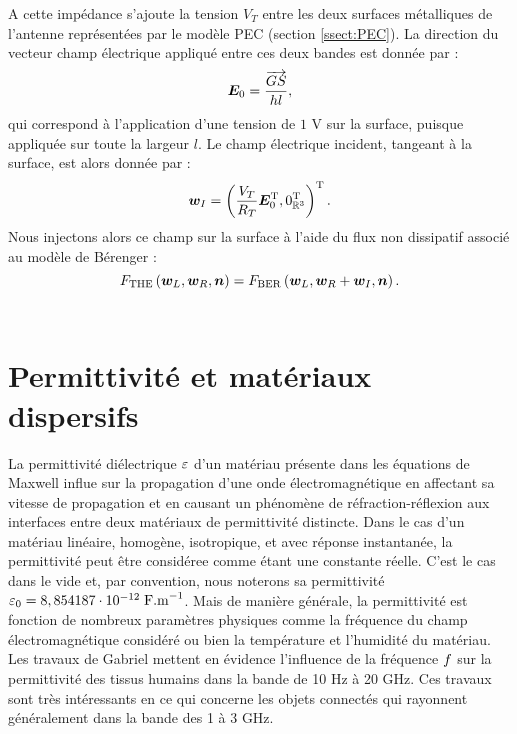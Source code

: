 A cette impédance s'ajoute la tension $V_T$ entre les deux surfaces
métalliques de l'antenne représentées par le modèle PEC (section \ref{ssect:PEC}).
La direction du vecteur champ électrique appliqué entre ces deux bandes est donnée par :
\begin{align}
	\bm{E}_0 = \frac{\overrightarrow{GS}}{h l} ,
\end{align}
qui correspond à l'application d'une tension de $1$ V sur la surface,
puisque appliquée sur toute la largeur $l$.
Le champ électrique incident, tangeant à la surface, est alors donnée par :
\begin{align}
	\bm{w}_I = \left(\frac{V_T}{R_T} \bm{E}_0^{\mathrm{T}} , 0_{\mathbb{R}^{3}}^{\mathrm{T}}\right)^{\mathrm{T}} .
\end{align}
Nous injectons alors ce champ sur la surface à l'aide du flux non
dissipatif associé au modèle de Bérenger :
\begin{equation}
F_\mathrm{THE}\left(\bm{w}_L,\bm{w}_R,\bm{n}\right) = F_\mathrm{BER}\left(\bm{w}_L,\bm{w}_R + \bm{w}_I,\bm{n}\right) .
\end{equation}
\\





\section{Permittivité et matériaux dispersifs}
\label{sect:permittivite}

La permittivité diélectrique $\varepsilon$ d'un matériau présente dans les équations
de Maxwell influe sur la propagation d'une onde électromagnétique en affectant sa
vitesse de propagation et en causant un phénomène de réfraction-réflexion aux interfaces
entre deux matériaux de permittivité distincte. Dans le cas d'un matériau linéaire,
homogène, isotropique, et avec réponse instantanée, la permittivité peut être considéree
comme étant une constante réelle. C'est le cas dans le vide et, par convention, nous
noterons sa permittivité $\varepsilon_0 = 8,854187 \cdot 10^{-12} \; \mathrm{F.m}^{-1}$. Mais de manière générale, la permittivité est fonction de
nombreux paramètres physiques comme la fréquence du champ électromagnétique considéré
ou bien la température et l'humidité du matériau.
\\

Les travaux de Gabriel \cite{Gabriel1,1996Gabiel,2009Gabriel} mettent en évidence l'influence de la fréquence
$f$ sur la permittivité des tissus humains dans la bande de 10 Hz à 20 GHz. Ces
travaux sont très intéressants en ce qui concerne les objets connectés qui rayonnent
généralement dans la bande des 1 à 3 GHz.


